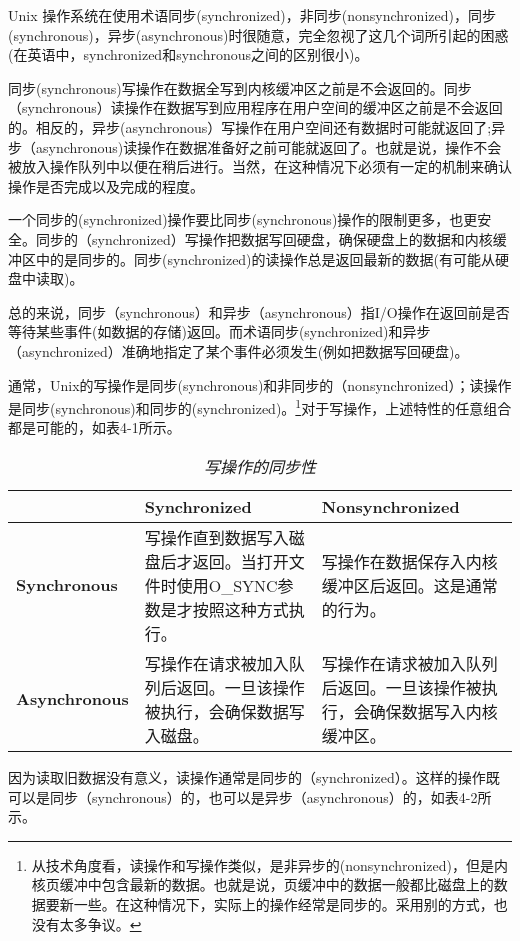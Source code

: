 Unix 操作系统在使用术语同步(synchronized)，非同步(nonsynchronized)，同步(synchronous)，异步(asynchronous)时很随意，完全忽视了这几个词所引起的困惑(在英语中，synchronized和synchronous之间的区别很小)。

同步(synchronous)写操作在数据全写到内核缓冲区之前是不会返回的。同步（synchronous）读操作在数据写到应用程序在用户空间的缓冲区之前是不会返回的。相反的，异步(asynchronous）写操作在用户空间还有数据时可能就返回了;异步（asynchronous)读操作在数据准备好之前可能就返回了。也就是说，操作不会被放入操作队列中以便在稍后进行。当然，在这种情况下必须有一定的机制来确认操作是否完成以及完成的程度。

一个同步的(synchronized)操作要比同步(synchronous)操作的限制更多，也更安全。同步的（synchronized）写操作把数据写回硬盘，确保硬盘上的数据和内核缓冲区中的是同步的。同步(synchronized)的读操作总是返回最新的数据(有可能从硬盘中读取)。

总的来说，同步（synchronous）和异步（asynchronous）指I/O操作在返回前是否等待某些事件(如数据的存储)返回。而术语同步(synchronized)和异步（asynchronized）准确地指定了某个事件必须发生(例如把数据写回硬盘)。

通常，Unix的写操作是同步(synchronous)和非同步的（nonsynchronized）；读操作是同步(synchronous)和同步的(synchronized)。\footnote[1]{从技术角度看，读操作和写操作类似，是非异步的(nonsynchronized)，但是内核页缓冲中包含最新的数据。也就是说，页缓冲中的数据一般都比磁盘上的数据要新一些。在这种情况下，实际上的操作经常是同步的。采用别的方式，也没有太多争议。}对于写操作，上述特性的任意组合都是可能的，如表4-1所示。

\begin{table}[htp]
\caption{\emph{写操作的同步性}}
\begin{tabular}{p{2.5cm}p{5.5cm}p{5.5cm}}\toprule
\rowcolor[gray]{.9}
 & \textbf{Synchronized} & \textbf{Nonsynchronized} \\ \midrule
\textbf{Synchronous} & 写操作直到数据写入磁盘后才返回。当打开文件时使用O\_SYNC参数是才按照这种方式执行。 & 写操作在数据保存入内核缓冲区后返回。这是通常的行为。 \\
\textbf{Asynchronous} & 写操作在请求被加入队列后返回。一旦该操作被执行，会确保数据写入磁盘。 & 写操作在请求被加入队列后返回。一旦该操作被执行，会确保数据写入内核缓冲区。\\ \bottomrule
\end{tabular}
\end{table}

因为读取旧数据没有意义，读操作通常是同步的（synchronized）。这样的操作既可以是同步（synchronous）的，也可以是异步（asynchronous）的，如表4-2所示。


